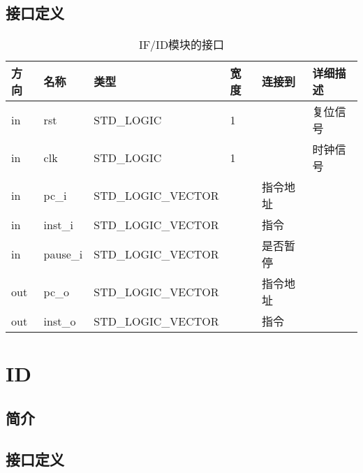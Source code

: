 \documentclass{article}
\begin{document}
\FloatBarrier
\subsection{接口定义}

\begin{table}
    \centering
    \small
    \begin{tabular}{lllllp{2cm}}
    \toprule
    方向 & 名称 & 类型 & 宽度 & 连接到 & 详细描述 \\ \midrule
    in & rst\label{IF/ID:rst} & STD_LOGIC & 1 & \nameref{sec:MIPS_CPU} & 复位信号 \\
    in & clk\label{IF/ID:clk} & STD_LOGIC & 1 & \nameref{sec:MIPS_CPU} & 时钟信号 \\
    in & pc_i\label{IF/ID:pc_i} & STD_LOGIC_VECTOR & \nameref{const:INST_ADDR_LEN} & 指令地址 \\
    in & inst_i\label{IF/ID:inst_i} & STD_LOGIC_VECTOR & \nameref{const:INST_LEN} & 指令 \\
    in & pause_i\label{IF/ID:pause_i} & STD_LOGIC_VECTOR & \nameref{const:CTRL_PAUSE_LEN} & 是否暂停 \\
    out & pc_o\label{IF/ID:pc_o} & STD_LOGIC_VECTOR & \nameref{const:INST_ADDR_LEN} & 指令地址 \\
    out & inst_o\label{IF/ID:inst_o} & STD_LOGIC_VECTOR & \nameref{const:INST_LEN} & 指令 \\
    \bottomrule
    \end{tabular}
    \caption {IF/ID模块的接口}
\end{table}
\FloatBarrier

\section{ID}
\label{sec:ID}

\subsection{简介}

\FloatBarrier
\subsection{接口定义}
\end{document}
